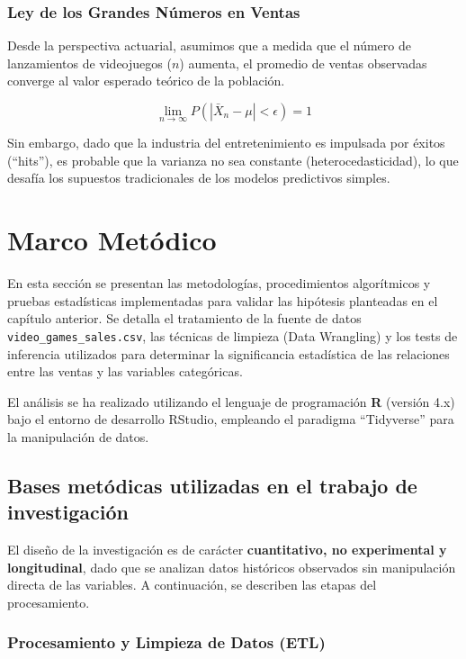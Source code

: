 \documentclass[oneside,11pt]{Latex/Classes/PhDthesisPSnPDF}
\begin{document}
\subsection{Ley de los Grandes Números en Ventas}

Desde la perspectiva actuarial, asumimos que a medida que el número de
lanzamientos de videojuegos (\(n\)) aumenta, el promedio de ventas
observadas converge al valor esperado teórico de la población.

\[\lim_{n \to \infty} P\left( \left| \bar{X}_n - \mu \right| < \epsilon \right) = 1\]

Sin embargo, dado que la industria del entretenimiento es impulsada por
éxitos (``hits''), es probable que la varianza no sea constante
(heterocedasticidad), lo que desafía los supuestos tradicionales de los
modelos predictivos simples.

\chapter{Marco Metódico}

En esta sección se presentan las metodologías, procedimientos
algorítmicos y pruebas estadísticas implementadas para validar las
hipótesis planteadas en el capítulo anterior. Se detalla el tratamiento
de la fuente de datos \texttt{video\_games\_sales.csv}, las técnicas de
limpieza (Data Wrangling) y los tests de inferencia utilizados para
determinar la significancia estadística de las relaciones entre las
ventas y las variables categóricas.

El análisis se ha realizado utilizando el lenguaje de programación
\textbf{R} (versión 4.x) bajo el entorno de desarrollo RStudio,
empleando el paradigma ``Tidyverse'' para la manipulación de datos.

\section{Bases metódicas utilizadas en el trabajo de investigación}

El diseño de la investigación es de carácter \textbf{cuantitativo, no
experimental y longitudinal}, dado que se analizan datos históricos
observados sin manipulación directa de las variables. A continuación, se
describen las etapas del procesamiento.

\subsection{Procesamiento y Limpieza de Datos (ETL)}
\end{document}
